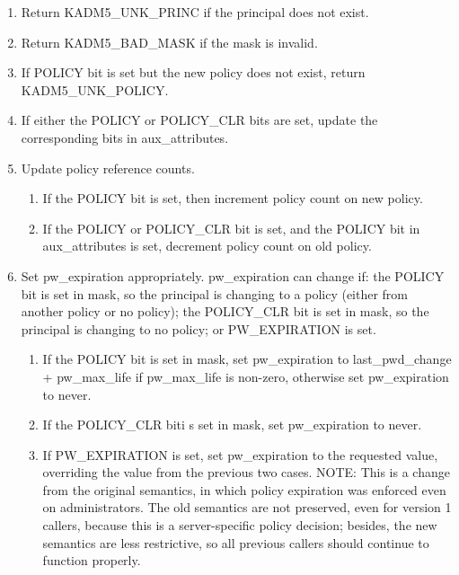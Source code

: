 \begin{enumerate}
\item Return KADM5_UNK_PRINC if the principal does not exist.
\item Return KADM5_BAD_MASK if the mask is invalid.
\item If POLICY bit is set but the new policy does not exist, return
KADM5_UNK_POLICY.
\item If either the POLICY or POLICY_CLR bits are set, update the
corresponding bits in aux_attributes.

\item Update policy reference counts.
\begin{enumerate}
\item If the POLICY bit is set, then increment policy count on new
policy.
\item If the POLICY or POLICY_CLR bit is set, and the POLICY bit in
aux_attributes is set, decrement policy count on old policy.
\end{enumerate}

\item Set pw_expiration appropriately.  pw_expiration can change if:
the POLICY bit is set in mask, so the principal is changing to a
policy (either from another policy or no policy); the POLICY_CLR bit
is set in mask, so the principal is changing to no policy; or
PW_EXPIRATION is set.
\begin{enumerate}
\item If the POLICY bit is set in mask, set pw_expiration to
last_pwd_change + pw_max_life if pw_max_life is non-zero, otherwise
set pw_expiration to never.
\item If the POLICY_CLR biti s set in mask, set pw_expiration to
never.
\item If PW_EXPIRATION is set, set pw_expiration to the requested
value, overriding the value from the previous two cases.  NOTE: This
is a change from the original semantics, in which policy expiration
was enforced even on administrators.  The old semantics are not
preserved, even for version 1 callers, because this is a
server-specific policy decision; besides, the new semantics are less
restrictive, so all previous callers should continue to function
properly.
\end{enumerate}



\end{enumerate}
